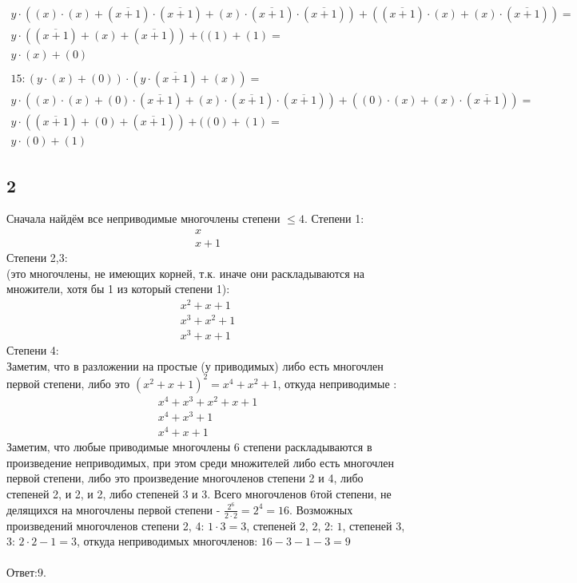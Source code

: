 \begin{gather*}
				y \cdot ((x)  \cdot  (x) + (\overline{x+1})  \cdot  (\overline{x+1}) + (x)  \cdot  (\overline{x+1})  \cdot  (\overline{x+1}) ) + ((\overline{x+1})  \cdot  (x) + (x)  \cdot  (\overline{x+1}) ) = \\
				y \cdot ((\overline{x+1}) + (x) + (\overline{x+1}) ) + ((1) + (1) = \\ y \cdot (x) + (0)
				\\ \\15: (y \cdot (x) + (0))  \cdot  (y \cdot (\overline{x+1}) + (x)) = \\ 
				y \cdot ((x)  \cdot  (x) + (0)  \cdot  (\overline{x+1}) + (x)  \cdot  (\overline{x+1})  \cdot  (\overline{x+1}) ) + ((0)  \cdot  (x) + (x)  \cdot  (\overline{x+1}) ) = \\
				y \cdot ((\overline{x+1}) + (0) + (\overline{x+1}) ) + ((0) + (1) = \\ y \cdot (0) + (1)
			\end{gather*}
		\subsection{2}
		
		Сначала найдём все неприводимые многочлены степени $\leqslant 4$.
		Степени 1: 
		\begin{gather*}
			x\\
			x+1
		\end{gather*}
		Степени 2,3:\\
		(это многочлены, не имеющих корней, т.к. иначе они раскладываются на множители, хотя бы 1 из который степени 1):
		\begin{gather*}
			x^2 + x + 1\\
			x^3 + x^2 + 1\\
			x^3 + x + 1
		\end{gather*}
		Степени 4:\\
		Заметим, что в разложении на простые (у приводимых) либо есть многочлен первой степени, либо это $(x^2 + x + 1)^2 = 
		x^4 + x^2 + 1$, откуда неприводимые :
		\begin{gather*}
			x^4 + x^3 + x^2 + x + 1\\
			x^4 + x^3 + 1\\
			x^4 + x + 1
		\end{gather*}
		Заметим, что любые приводимые многочлены 6 степени раскладываются в произведение неприводимых, при этом среди множителей либо есть многочлен первой степени, либо это произведение многочленов степени 2 и 4, либо степеней 2, и 2, и 2, либо степеней 3 и 3. Всего многочленов 6той степени, не делящихся на многочлены первой степени - $\frac{2^6}{2 \cdot 2} = 2^4 = 16$. Возможных произведений многочленов степени 2, 4: $1 \cdot 3 = 3$, степеней 2, 2, 2: $1$, степеней 3, 3: $2 \cdot 2 - 1 = 3$, откуда неприводимых многочленов: $16 - 3 - 1 - 3 = 9$\\
		\\
		Ответ:$9$.
		
